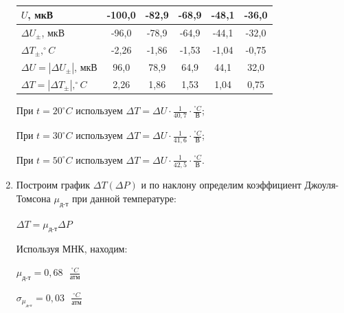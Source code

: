 \documentclass[a4paper, 12pt]{article}
\begin{document}
\begin{enumerate}
\begin{table}[H]
\begin{tabular}{|l|c|c|c|c|c|c|}
		$U$, мкВ                                & \multicolumn{2}{c|}{-100,0} & -82,9    & -68,9   & -48,1   & -36,0   \\ \hline
		$\Delta U_{\pm}$, мкВ                   & \multicolumn{2}{c|}{-96,0}  & -78,9    & -64,9   & -44,1   & -32,0   \\ \hline
		$\Delta T_{\pm},^\circ C$               & \multicolumn{2}{c|}{-2,26}  & -1,86    & -1,53   & -1,04   & -0,75   \\ \hline
		$\Delta U = |\Delta U_{\pm}|$, мкВ      & \multicolumn{2}{c|}{96,0}   & 78,9     & 64,9    & 44,1    & 32,0    \\ \hline
		$\Delta T = |\Delta T_{\pm}|, ^\circ C$ & \multicolumn{2}{c|}{2,26}   & 1,86     & 1,53    & 1,04    & 0,75    \\ \hline
	\end{tabular}
\caption{}
\end{table}
При $t = 20^\circ C$ используем $\Delta T = \Delta U \cdot \frac{1}{40,7} \cdot \frac{^\circ C}{\text{В}}$;

При $t = 30^\circ C$ используем $\Delta T = \Delta U \cdot \frac{1}{41,6} \cdot \frac{^\circ C}{\text{В}}$;

При $t = 50^\circ C$ используем $\Delta T = \Delta U \cdot \frac{1}{42,5} \cdot \frac{^\circ C}{\text{В}}$.

\item Построим график $\Delta T(\Delta P)$ и по наклону определим коэффициент Джоуля-Томсона $\mu_{\text{д-т}}$ при данной температуре:


\vspace{2mm}
$\Delta T = \mu_{\text{д-т}}\Delta P$
\vspace{2mm}


Используя МНК, находим:
\vspace{2mm}

$\mu_{\text{д-т}} = 0,68 \text{ }\frac{^\circ C}{\text{атм}}$

$\sigma_{\mu_{\text{д-т}}} = 0,03 \text{ }\frac{^\circ C}{\text{атм}}$


\end{enumerate}
\end{document}
